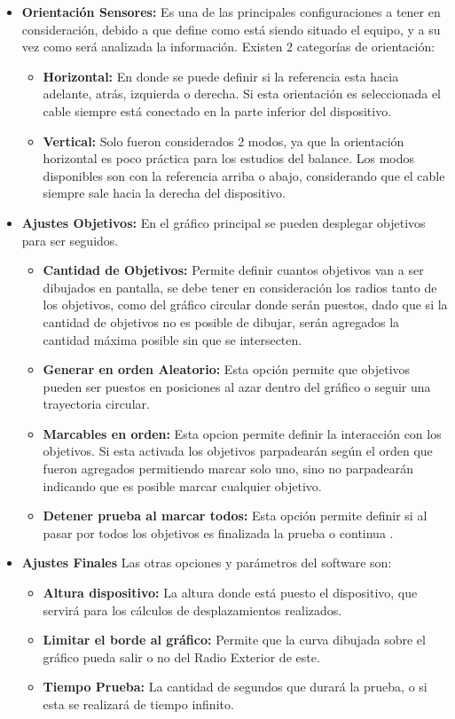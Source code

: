 \documentclass[12pt,a4paper]{article}
\begin{document}
\begin{itemize}
	\item \textbf{Orientación Sensores:} Es una de las principales configuraciones a tener en consideración, debido a que define como está siendo situado el equipo, y a su vez como será analizada la información.
	Existen 2 categorías de orientación:
	\begin{itemize}
		\item \textbf{Horizontal:} En donde se puede definir si la referencia esta hacia adelante, atrás, izquierda o derecha. Si esta orientación es seleccionada el cable siempre está conectado en la parte inferior del dispositivo.
		\item \textbf{Vertical:} Solo fueron considerados 2 modos, ya que  la orientación horizontal es poco práctica para los estudios del balance.
		Los modos disponibles son con la referencia arriba o abajo, considerando que el cable siempre sale hacia la derecha del dispositivo.
	\end{itemize}
	\item \textbf{Ajustes Objetivos:} En el gráfico principal se pueden desplegar objetivos para ser seguidos.
	\begin{itemize}
		\item \textbf{Cantidad de Objetivos:} Permite definir cuantos objetivos van a ser dibujados en pantalla, se debe tener en consideración los radios tanto de los objetivos, como del gráfico circular donde serán puestos, dado que si la cantidad de objetivos no es posible de dibujar, serán agregados la cantidad máxima posible sin que se intersecten.
		\item \textbf{Generar en orden Aleatorio:} Esta opción permite que objetivos pueden ser puestos en posiciones al azar dentro del gráfico o seguir una trayectoria circular.
		\item \textbf{Marcables en orden:} Esta opcion permite definir la interacción con los objetivos.
		Si esta activada los objetivos parpadearán según el orden que fueron agregados permitiendo marcar solo uno, sino no parpadearán indicando que es posible marcar cualquier objetivo.
		\item \textbf{Detener prueba al marcar todos:} Esta opción permite definir si al pasar por todos los objetivos es finalizada la prueba o continua .
	\end{itemize}
	
	\item \textbf{Ajustes Finales} Las otras opciones y parámetros del software son:
	\begin{itemize}
		\item \textbf{Altura dispositivo:} La altura donde está puesto el dispositivo, que servirá para los cálculos de desplazamientos realizados.
		\item \textbf{Limitar el borde al gráfico:} Permite que la curva dibujada sobre el gráfico pueda salir o no del Radio Exterior de este.
		\item \textbf{Tiempo Prueba:} La cantidad de segundos que durará la prueba, o si esta se realizará de tiempo infinito.
	\end{itemize}
\end{itemize}
\end{document}

